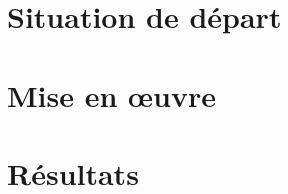 
\section*{Situation de départ}
\blindtext[1]

\section*{Mise en œuvre}
\blindtext[1]

\section*{Résultats}
\blindtext[1]
